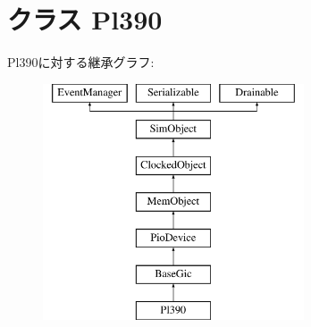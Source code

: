 \hypertarget{classGic_1_1Pl390}{
\section{クラス Pl390}
\label{classGic_1_1Pl390}
}
Pl390に対する継承グラフ:\begin{figure}[H]
\begin{center}
\leavevmode
\includegraphics[height=7cm]{classGic_1_1Pl390}
\end{center}
\end{figure}
